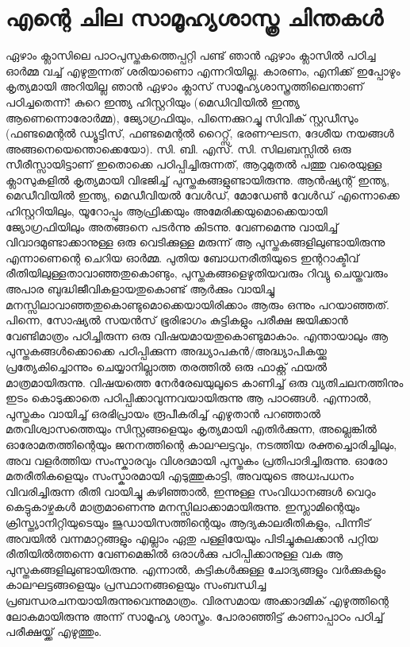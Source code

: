 \section*{എന്റെ ചില സാമൂഹ്യശാസ്ത്ര ചിന്തകള്‍}
\vskip 2pt

ഏഴാം ക്ലാസിലെ പാഠപുസ്തകത്തെപ്പറ്റി പണ്ട് ഞാന്‍ ഏഴാം ക്ലാസില്‍ പഠിച്ച ഓര്‍മ്മ വച്ച് എഴുതുന്നത് ശരിയാണൊ എന്നറിയില്ല. കാരണം,
എനിക്ക് ഇപ്പോഴും കൃത്യമായി അറിയില്ല ഞാന്‍ ഏഴാം ക്ലാസ് സാമൂഹ്യശാസ്ത്രത്തിലെന്താണ് പഠിച്ചതെന്ന്! കുറെ ഇന്ത്യ ഹിസ്റ്ററിയും 
(മെഡിവിയില്‍ ഇന്ത്യ ആണെന്നൊരോര്‍മ്മ), ജ്യോഗ്രഫിയും, പിന്നെക്കുറച്ചു സിവിക് സ്റ്റഡീസും (ഫണ്ടമെന്റല്‍ ഡ്യൂട്ടിസ്, ഫണ്ടമെന്റല്‍ റൈറ്റ്സ്, 
ഭരണഘടന, ദേശീയ നയങ്ങള്‍ അങ്ങനെയെന്തൊക്കെയോ). സി. ബി. എസ്. സി. സിലബസ്സില്‍ ഒരു സീരീസ്സായിട്ടാണ് ഇതൊക്കെ പഠിപ്പിച്ചിരുന്നത്, 
ആറുമുതല്‍ പത്തു വരെയുള്ള ക്ലാസുകളില്‍ കൃത്യമായി വിഭജിച്ച് പുസ്തകങ്ങളുണ്ടായിരുന്നു. ആന്‍ഷ്യന്റ് ഇന്ത്യ, മെഡീവിയില്‍ ഇന്ത്യ, മെഡീവിയല്‍ വേള്‍ഡ്, 
മോഡേണ്‍ വേള്‍ഡ് എന്നൊക്കെ ഹിസ്റ്ററിയിലും, യൂറോപ്പും ആഫ്രിക്കയും അമേരിക്കയുമൊക്കെയായി ജ്യോഗ്രഫിയിലും അതങ്ങനെ പടര്‍ന്നു കിടന്നു. 
വേണമെന്നു വായിച്ച് വിവാദമുണ്ടാക്കാനുള്ള ഒരു വെടിക്കുള്ള മരുന്ന് ആ പുസ്തകങ്ങളിലുണ്ടായിരുന്നു എന്നാണെന്റെ ചെറിയ ഓര്‍മ്മ. പുതിയ ബോധനരീതിയുടെ 
ഇന്ററാക്ടീവ് രീതിയിലുള്ളതാവാഞ്ഞതുകൊണ്ടും, പുസ്തകങ്ങളെഴുതിയവരും റിവ്യു ചെയ്തവരും അപാര ബുദ്ധിജീവികളായതുകൊണ്ട് ആര്‍ക്കും വായിച്ചു 
മനസ്സിലാവാഞ്ഞതുകൊണ്ടുമൊക്കെയായിരിക്കാം ആരും ഒന്നും പറയാഞ്ഞത്. പിന്നെ, സോഷ്യല്‍ സയന്‍സ് ഭൂരിഭാഗം കുട്ടികളും പരീക്ഷ ജയിക്കാന്‍ 
വേണ്ടിമാത്രം പഠിച്ചിരുന്ന ഒരു വിഷയമായതുകൊണ്ടുമാകാം. എന്തായാലും ആ പുസ്തകങ്ങള്‍ക്കൊക്കെ പഠിപ്പിക്കുന്ന അദ്ധ്യാപകന്‍/അദ്ധ്യാപികയ്ക്കു പ്രത്യേകിച്ചൊന്നും 
ചെയ്യാനില്ലാത്ത തരത്തില്‍ ഒരു ഫാക്റ്റ് ഫയല്‍ മാത്രമായിരുന്നു. വിഷയത്തെ നേര്‍രേഖയുലൂടെ കാണിച്ച് ഒരു വ്യതിചലനത്തിനും ഇടം കൊടുക്കാതെ 
പഠിപ്പിക്കാവുന്നവയായിരുന്നു ആ പാഠങ്ങള്‍. എന്നാല്‍, പുസ്തകം വായിച്ച് ഒരഭിപ്രായം രൂപീകരിച്ച് എഴുതാന്‍ പറഞ്ഞാല്‍ മതവിശ്വാസത്തെയും സിസ്റ്റങ്ങളെയും 
കൃത്യമായി എതിര്‍ക്കുന്ന, അല്ലെങ്കില്‍ ഓരോമതത്തിന്റെയും ജനനത്തിന്റെ കാലഘട്ടവും, നടത്തിയ രക്തച്ചൊരിച്ചിലും, അവ വളര്‍ത്തിയ സംസ്കാരവും വിശദമായി 
പുസ്തകം പ്രതിപാദിച്ചിരുന്നു. ഓരോ മതരീതികളെയും സംസ്കാരമായി എടുത്തുകാട്ടി, അവയുടെ അധഃപധനം വിവരിച്ചിരുന്ന രീതി വായിച്ചു കഴിഞ്ഞാല്‍, ഇന്നുള്ള 
സംവിധാനങ്ങള്‍ വെറും കെട്ടുകാഴ്ചകള്‍ മാത്രമാണെന്നു മനസ്സിലാക്കാമായിരുന്നു. ഇസ്ലാമിന്റെയും ക്രിസ്ത്യാനിറ്റിയുടെയും ജുഡായിസത്തിന്റെയും ആദ്യകാലരീതികളും, 
പിന്നീട് അവയില്‍ വന്നമാറ്റങ്ങളും എല്ലാം ഏതു പള്ളിയേയും പിടിച്ചുകുലക്കാന്‍ പറ്റിയ രീതിയില്‍ത്തന്നെ വേണമെങ്കില്‍ ഒരാള്‍ക്കു പഠിപ്പിക്കാനുള്ള വക ആ 
പുസ്തകങ്ങളിലുണ്ടായിരുന്നു. എന്നാല്‍, കുട്ടികള്‍ക്കുള്ള ചോദ്യങ്ങളും വര്‍ക്കുകളും കാലഘട്ടങ്ങളെയും പ്രസ്ഥാനങ്ങളെയും സംബന്ധിച്ച പ്രബന്ധരചനയായിരുന്നുവെന്നുമാത്രം. 
വിരസമായ അക്കാദമിക് എഴുത്തിന്റെ ലോകമായിരുന്നു അന്ന് സാമൂഹ്യ ശാസ്ത്രം. പോരാഞ്ഞിട്ട് കാണാപ്പാഠം പഠിച്ച് പരീക്ഷയ്ക്ക് എഴുത്തും.


